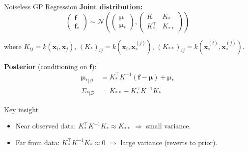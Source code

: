 \documentclass[aspectratio=169,11pt]{beamer}
\newcommand{\emphc}[1]{\textcolor{harvardcrimson}{#1}}
\newcommand{\x}{\bm{x}}
\begin{document}
\begin{frame}{Noiseless GP Regression}
\textbf{Joint distribution:}
\[
\begin{pmatrix} \bm{f} \\ \bm{f}_* \end{pmatrix}
\sim \mathcal{N}\!\left(
\begin{pmatrix} \bm{\mu} \\ \bm{\mu}_* \end{pmatrix},
\begin{pmatrix} K & K_* \\ K_*^\top & K_{**} \end{pmatrix}
\right)
\]

where $K_{ij} = k(\x_i, \x_j)$, \; $(K_*)_{ij} = k(\x_i, \x_*^{(j)})$, \; $(K_{**})_{ij} = k(\x_*^{(i)}, \x_*^{(j)})$.

\vspace{0.3cm}
\textbf{Posterior} (conditioning on $\bm{f}$):
\begin{align}
\bm{\mu}_{*|\mathcal{D}} &= K_*^\top K^{-1}(\bm{f} - \bm{\mu}) + \bm{\mu}_* \label{eq:gp_mean}\\
\Sigma_{*|\mathcal{D}} &= K_{**} - K_*^\top K^{-1} K_* \label{eq:gp_var}
\end{align}

\vspace{0.2cm}
\begin{alertblock}{Key insight}
\begin{itemize}
  \item Near observed data: $K_*^\top K^{-1} K_* \approx K_{**}$ $\Rightarrow$ \emphc{small variance}.
  \item Far from data: $K_*^\top K^{-1} K_* \approx 0$ $\Rightarrow$ \emphc{large variance} (reverts to prior).
\end{itemize}
\end{alertblock}
\end{frame}
\end{document}
